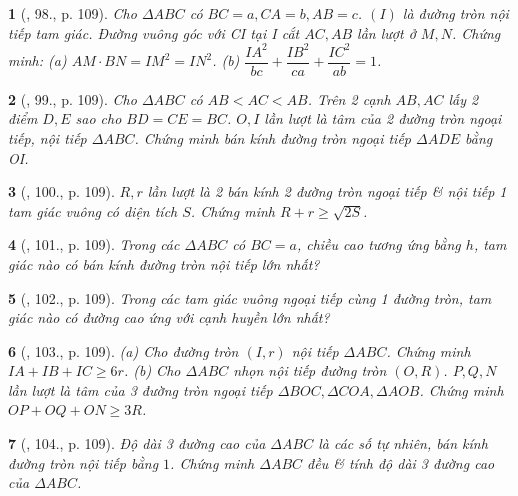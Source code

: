 \documentclass{article}
\newtheorem{baitoan}{}
\begin{document}
\begin{baitoan}[\cite{Binh_Toan_9_tap_1}, 98., p. 109]
	Cho $\Delta ABC$ có $BC = a,CA = b,AB = c$. $(I)$ là đường tròn nội tiếp tam giác. Đường vuông góc với CI tại I cắt $AC,AB$ lần lượt ở $M,N$. Chứng minh: (a) $AM\cdot BN = IM^2 = IN^2$. (b) $\dfrac{IA^2}{bc} + \dfrac{IB^2}{ca} + \dfrac{IC^2}{ab} = 1$.
\end{baitoan}

\begin{baitoan}[\cite{Binh_Toan_9_tap_1}, 99., p. 109]
	Cho $\Delta ABC$ có $AB < AC < AB$. Trên 2 cạnh $AB,AC$ lấy 2 điểm $D,E$ sao cho $BD = CE = BC$. $O,I$ lần lượt là tâm của 2 đường tròn ngoại tiếp, nội tiếp $\Delta ABC$. Chứng minh bán kính đường tròn ngoại tiếp $\Delta ADE$ bằng OI.
\end{baitoan}

\begin{baitoan}[\cite{Binh_Toan_9_tap_1}, 100., p. 109]
	$R,r$ lần lượt là 2 bán kính 2 đường tròn ngoại tiếp \& nội tiếp 1 tam giác vuông có diện tích $S$. Chứng minh $R + r\ge\sqrt{2S}$.
\end{baitoan}

\begin{baitoan}[\cite{Binh_Toan_9_tap_1}, 101., p. 109]
	Trong các $\Delta ABC$ có $BC = a$, chiều cao tương ứng bằng $h$, tam giác nào có bán kính đường tròn nội tiếp lớn nhất?
\end{baitoan}

\begin{baitoan}[\cite{Binh_Toan_9_tap_1}, 102., p. 109]
	Trong các tam giác vuông ngoại tiếp cùng 1 đường tròn, tam giác nào có đường cao ứng với cạnh huyền lớn nhất?
\end{baitoan}

\begin{baitoan}[\cite{Binh_Toan_9_tap_1}, 103., p. 109]
	(a) Cho đường tròn $(I,r)$ nội tiếp $\Delta ABC$. Chứng minh $IA + IB + IC\ge6r$. (b) Cho $\Delta ABC$  nhọn nội tiếp đường tròn $(O,R)$. $P,Q,N$ lần lượt là tâm của 3 đường tròn ngoại tiếp $\Delta BOC,\Delta COA,\Delta AOB$. Chứng minh $OP + OQ + ON\ge3R$.
\end{baitoan}

\begin{baitoan}[\cite{Binh_Toan_9_tap_1}, 104., p. 109]
	Độ dài 3 đường cao của $\Delta ABC$ là các số tự nhiên, bán kính đường tròn nội tiếp bằng $1$. Chứng minh $\Delta ABC$ đều \& tính độ dài 3 đường cao của $\Delta ABC$.
\end{baitoan}
\end{document}
